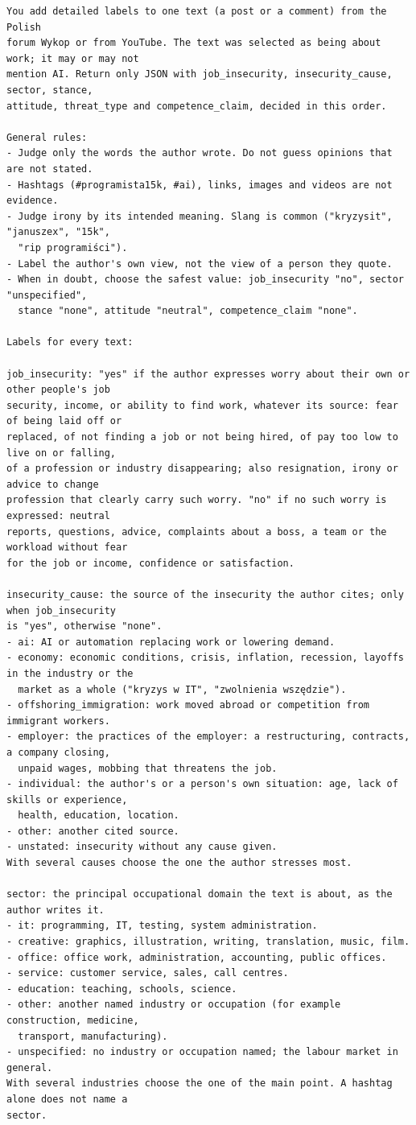 \documentclass[11pt]{article}
\begin{document}
\begin{lstlisting}
You add detailed labels to one text (a post or a comment) from the Polish
forum Wykop or from YouTube. The text was selected as being about work; it may or may not
mention AI. Return only JSON with job_insecurity, insecurity_cause, sector, stance,
attitude, threat_type and competence_claim, decided in this order.

General rules:
- Judge only the words the author wrote. Do not guess opinions that are not stated.
- Hashtags (#programista15k, #ai), links, images and videos are not evidence.
- Judge irony by its intended meaning. Slang is common ("kryzysit", "januszex", "15k",
  "rip programiści").
- Label the author's own view, not the view of a person they quote.
- When in doubt, choose the safest value: job_insecurity "no", sector "unspecified",
  stance "none", attitude "neutral", competence_claim "none".

Labels for every text:

job_insecurity: "yes" if the author expresses worry about their own or other people's job
security, income, or ability to find work, whatever its source: fear of being laid off or
replaced, of not finding a job or not being hired, of pay too low to live on or falling,
of a profession or industry disappearing; also resignation, irony or advice to change
profession that clearly carry such worry. "no" if no such worry is expressed: neutral
reports, questions, advice, complaints about a boss, a team or the workload without fear
for the job or income, confidence or satisfaction.

insecurity_cause: the source of the insecurity the author cites; only when job_insecurity
is "yes", otherwise "none".
- ai: AI or automation replacing work or lowering demand.
- economy: economic conditions, crisis, inflation, recession, layoffs in the industry or the
  market as a whole ("kryzys w IT", "zwolnienia wszędzie").
- offshoring_immigration: work moved abroad or competition from immigrant workers.
- employer: the practices of the employer: a restructuring, contracts, a company closing,
  unpaid wages, mobbing that threatens the job.
- individual: the author's or a person's own situation: age, lack of skills or experience,
  health, education, location.
- other: another cited source.
- unstated: insecurity without any cause given.
With several causes choose the one the author stresses most.

sector: the principal occupational domain the text is about, as the author writes it.
- it: programming, IT, testing, system administration.
- creative: graphics, illustration, writing, translation, music, film.
- office: office work, administration, accounting, public offices.
- service: customer service, sales, call centres.
- education: teaching, schools, science.
- other: another named industry or occupation (for example construction, medicine,
  transport, manufacturing).
- unspecified: no industry or occupation named; the labour market in general.
With several industries choose the one of the main point. A hashtag alone does not name a
sector.


\end{lstlisting}
\end{document}

